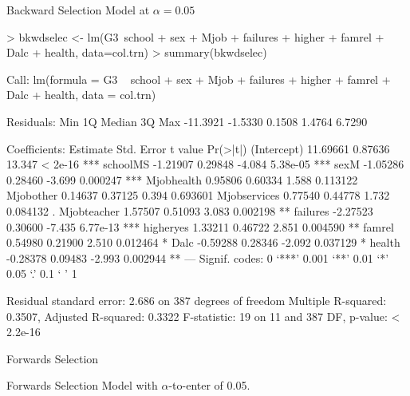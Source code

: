 \documentclass{article}
\begin{document}
Backward Selection Model at $\alpha = 0.05$
\begin{Schunk}
\begin{Sinput}
> bkwdselec <- lm(G3~school + sex + Mjob + failures + higher + famrel + Dalc + health, data=col.trn)
> summary(bkwdselec)
\end{Sinput}
\begin{Soutput}
Call:
lm(formula = G3 ~ school + sex + Mjob + failures + higher + famrel + 
    Dalc + health, data = col.trn)

Residuals:
     Min       1Q   Median       3Q      Max 
-11.3921  -1.5330   0.1508   1.4764   6.7290 

Coefficients:
             Estimate Std. Error t value Pr(>|t|)    
(Intercept)  11.69661    0.87636  13.347  < 2e-16 ***
schoolMS     -1.21907    0.29848  -4.084 5.38e-05 ***
sexM         -1.05286    0.28460  -3.699 0.000247 ***
Mjobhealth    0.95806    0.60334   1.588 0.113122    
Mjobother     0.14637    0.37125   0.394 0.693601    
Mjobservices  0.77540    0.44778   1.732 0.084132 .  
Mjobteacher   1.57507    0.51093   3.083 0.002198 ** 
failures     -2.27523    0.30600  -7.435 6.77e-13 ***
higheryes     1.33211    0.46722   2.851 0.004590 ** 
famrel        0.54980    0.21900   2.510 0.012464 *  
Dalc         -0.59288    0.28346  -2.092 0.037129 *  
health       -0.28378    0.09483  -2.993 0.002944 ** 
---
Signif. codes:  0 ‘***’ 0.001 ‘**’ 0.01 ‘*’ 0.05 ‘.’ 0.1 ‘ ’ 1

Residual standard error: 2.686 on 387 degrees of freedom
Multiple R-squared:  0.3507,	Adjusted R-squared:  0.3322 
F-statistic:    19 on 11 and 387 DF,  p-value: < 2.2e-16
\end{Soutput}
\end{Schunk}

Forwards Selection

Forwards Selection Model with $\alpha$-to-enter of 0.05. 
\end{document}
